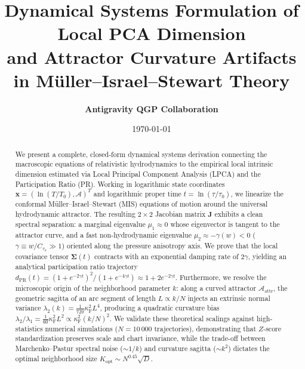 \documentclass[11pt,a4paper]{article}
\title{\textbf{Dynamical Systems Formulation of Local PCA Dimension\\and Attractor Curvature Artifacts in Müller--Israel--Stewart Theory}}
\author{\textbf{Antigravity QGP Collaboration}}
\date{\today}
\begin{document}
\maketitle

\begin{abstract}
We present a complete, closed-form dynamical systems derivation connecting the macroscopic equations of relativistic hydrodynamics to the empirical local intrinsic dimension estimated via Local Principal Component Analysis (LPCA) and the Participation Ratio (PR). Working in logarithmic state coordinates $\mathbf{x} = (\ln(T/T_0), \mathcal{A})^T$ and logarithmic proper time $t = \ln(\tau/\tau_0)$, we linearize the conformal Müller--Israel--Stewart (MIS) equations of motion around the universal hydrodynamic attractor. The resulting $2\times 2$ Jacobian matrix $\mathbf{J}$ exhibits a clean spectral separation: a marginal eigenvalue $\mu_1 \approx 0$ whose eigenvector is tangent to the attractor curve, and a fast non-hydrodynamic eigenvalue $\mu_2 \approx -\gamma(w) < 0$ ($\gamma \equiv w / C_{\tau_\pi} \gg 1$) oriented along the pressure anisotropy axis. We prove that the local covariance tensor $\mathbf{\Sigma}(t)$ contracts with an exponential damping rate of $2\gamma$, yielding an analytical participation ratio trajectory $d_{\mathrm{PR}}(t) = (1 + e^{-2\gamma t})^2 / (1 + e^{-4\gamma t}) \approx 1 + 2e^{-2\gamma t}$. Furthermore, we resolve the microscopic origin of the neighborhood parameter $k$: along a curved attractor $\mathcal{A}_{\mathrm{attr}}$, the geometric sagitta of an arc segment of length $L \propto k/N$ injects an extrinsic normal variance $\lambda_2(k) = \frac{1}{720}\kappa_{\mathrm{F}}^2 L^4$, producing a quadratic curvature bias $\lambda_2/\lambda_1 = \frac{1}{60}\kappa_{\mathrm{F}}^2 L^2 \propto \kappa_{\mathrm{F}}^2 (k/N)^2$. We validate these theoretical scalings against high-statistics numerical simulations ($N = 10\,000$ trajectories), demonstrating that $Z$-score standardization preserves scale and chart invariance, while the trade-off between Marchenko--Pastur spectral noise ($\sim 1/k$) and curvature sagitta ($\sim k^2$) dictates the optimal neighborhood size $K_{\mathrm{opt}} \sim N^{0.45}\sqrt{D}$.
\end{abstract}

\vspace{0.5em}
\tableofcontents
\newpage

\end{document}
